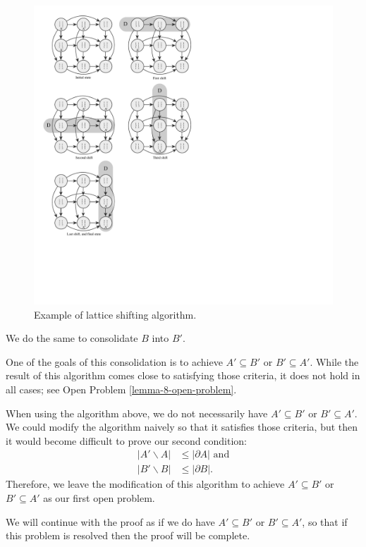 	\begin{figure}[ht]
		\begin{center}
			\includegraphics[width=4.6in]{../figures/diagram8.pdf}
			\caption{Example of lattice shifting algorithm.}
			\label{figure-algorithm-example}
		\end{center}
	\end{figure}

	We do the same to consolidate $B$ into $B'$.

	One of the goals of this consolidation is to achieve $A' \subseteq B'$ or $B' \subseteq A'$. While the result of this algorithm comes close to satisfying those criteria, it does not hold in all cases; see Open Problem \ref{lemma-8-open-problem}.

	\begin{openproblem}
		\label{lemma-8-open-problem}
		When using the algorithm above, we do not necessarily have $A' \subseteq B'$ or $B' \subseteq A'$. We could modify the algorithm naively so that it satisfies those criteria, but then it would become difficult to prove our second condition:
		\begin{align*}
			|A' \backslash A| &\le |\partial A| \textrm{ and} \\
			|B' \backslash B| &\le |\partial B|.
		\end{align*}
		Therefore, we leave the modification of this algorithm to achieve $A' \subseteq B'$ or $B' \subseteq A'$ as our first open problem.

		We will continue with the proof as if we do have $A' \subseteq B'$ or $B' \subseteq A'$, so that if this problem is resolved then the proof will be complete.
	\end{openproblem}

